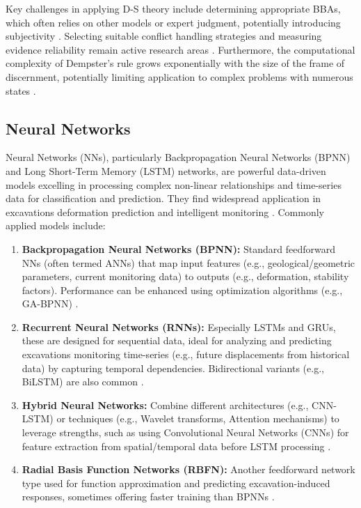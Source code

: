 \documentclass[preprint,11pt,authoryear,3p]{elsarticle}
\begin{document}
Key challenges in applying D-S theory include determining appropriate BBAs, which often relies on other models or expert judgment, potentially introducing subjectivity \citep{AMultiSourceIntelligent}. Selecting suitable conflict handling strategies and measuring evidence reliability remain active research areas \citep{ZHAO2022109075}. Furthermore, the computational complexity of Dempster's rule grows exponentially with the size of the frame of discernment, potentially limiting application to complex problems with numerous states \citep{LI2021103948}.

\subsection{Neural Networks}

Neural Networks (NNs), particularly Backpropagation Neural Networks (BPNN) and Long Short-Term Memory (LSTM) networks, are powerful data-driven models excelling in processing complex non-linear relationships and time-series data for classification and prediction. They find widespread application in excavations deformation prediction and intelligent monitoring \citep{WU2023184, YANG2024, XIE2022101313}. Commonly applied models include:

\begin{enumerate}
    \item \textbf{Backpropagation Neural Networks (BPNN):} Standard feedforward NNs (often termed ANNs) that map input features (e.g., geological/geometric parameters, current monitoring data) to outputs (e.g., deformation, stability factors). Performance can be enhanced using optimization algorithms (e.g., GA-BPNN) \citep{LU2023139241}.

    \item \textbf{Recurrent Neural Networks (RNNs):} Especially LSTMs and GRUs, these are designed for sequential data, ideal for analyzing and predicting excavations monitoring time-series (e.g., future displacements from historical data) by capturing temporal dependencies. Bidirectional variants (e.g., BiLSTM) are also common \citep{LI2023105243}.

    \item \textbf{Hybrid Neural Networks:} Combine different architectures (e.g., CNN-LSTM) or techniques (e.g., Wavelet transforms, Attention mechanisms) to leverage strengths, such as using Convolutional Neural Networks (CNNs) for feature extraction from spatial/temporal data before LSTM processing \citep{zhao2025early}.

    \item \textbf{Radial Basis Function Networks (RBFN):} Another feedforward network type used for function approximation and predicting excavation-induced responses, sometimes offering faster training than BPNNs \citep{zhou_performance_2021}.
\end{enumerate}
\end{document}
